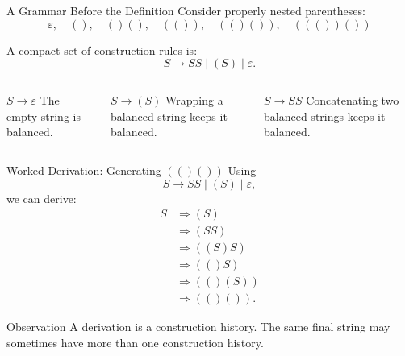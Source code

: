 \documentclass[aspectratio=169,10pt]{beamer}
\newcommand{\eps}{\varepsilon}
\newcommand{\der}{\Rightarrow}
\begin{document}
\begin{frame}{A Grammar Before the Definition}
\small
Consider properly nested parentheses:
\[
\eps,\quad (),\quad ()(),\quad (()),\quad (()()),\quad ((())())
\]

A compact set of construction rules is:
\[
S\to SS \mid (S) \mid \eps.
\]

\begin{columns}[T,onlytextwidth]
\begin{block}{\(S\to\eps\)}
The empty string is balanced.
\end{block}

\begin{exampleblock}{\(S\to(S)\)}
Wrapping a balanced string keeps it balanced.
\end{exampleblock}

\begin{alertblock}{\(S\to SS\)}
Concatenating two balanced strings keeps it balanced.
\end{alertblock}
\end{columns}
\end{frame}

\begin{frame}{Worked Derivation: Generating \( (()()) \)}
\small
Using
\[
S\to SS\mid (S)\mid\eps,
\]
we can derive:
\begin{align*}
S
&\der (S)\\
&\der (SS)\\
&\der ((S)S)\\
&\der (()S)\\
&\der (()(S))\\
&\der (()()).
\end{align*}

\begin{exampleblock}{Observation}
A derivation is a construction history. The same final string may sometimes have more than one construction history.
\end{exampleblock}
\end{frame}
\end{document}
